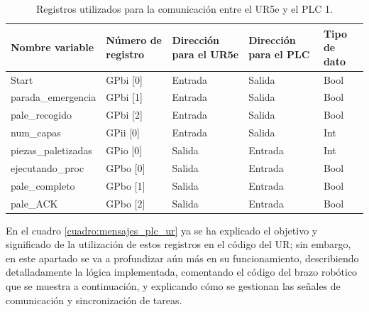 \begin{table}[H]
\begin{center}

\renewcommand{\arraystretch}{1.5}
\begin{tabular}{|M{3.4cm}|M{2.3cm}|M{3cm}|M{2.5cm}|M{2cm}|}
\hline
\textbf{Nombre variable} &
\textbf{Número de registro} & 
\textbf{Direcci\'on para el UR5e} & 
\textbf{Direcci\'on para el PLC} &
\textbf{Tipo de dato} \\
\hline
Start  & GPbi [0] & Entrada & Salida & Bool \\
\hline
parada\_emergencia  & GPbi [1] & Entrada & Salida & Bool \\
\hline
pale\_recogido  & GPbi [2] & Entrada & Salida & Bool \\
\hline
num\_capas  & GPii [0] & Entrada & Salida & Int \\
\hline
piezas\_paletizadas  & GPio [0] & Salida & Entrada  & Int \\
\hline
ejecutando\_proc  & GPbo [0] & Salida & Entrada & Bool \\
\hline
pale\_completo  & GPbo [1] & Salida & Entrada & Bool \\
\hline
pale\_ACK  & GPbo [2] & Salida & Entrada & Bool \\
\hline

\end{tabular}

\caption{Registros utilizados para la comunicación entre el UR5e y el PLC 1.}
\label{cuadro:registros}
\end{center}
\end{table}

En el cuadro \ref{cuadro:mensajes_plc_ur} ya se ha explicado el objetivo y significado de la utilización de estos registros en el código del UR; sin embargo, en este apartado se va a profundizar aún más en su funcionamiento, describiendo detalladamente la lógica implementada, comentando el código del brazo robótico que se muestra a continuación, y explicando cómo se gestionan las señales de comunicación y sincronización de tareas.

